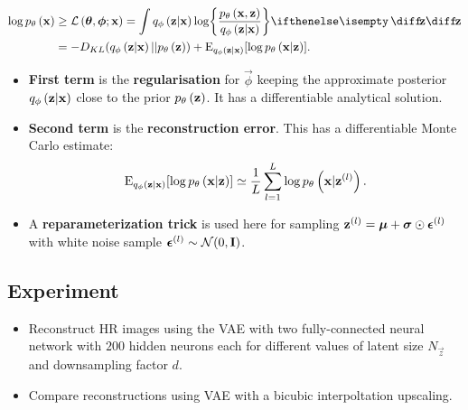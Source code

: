 \begin{itemize}
		\begin{gather*}
			\begin{split}
				\log \dec{\vec{x}} & \ge \mathcal{L}\left(\vec{\theta},\vec{\phi};\vec{x}\right) =
				\int \enc{\vec{z}|\vec{x}} \log \curlies*{ \frac{\dec{\vec{x},\vec{z}}}{\enc{\vec{z}|\vec{x}} } } \D{\vec{z}} \\
				& = -D_{KL}\parens{ \enc{\vec{z}|\vec{x}}||\dec{\vec{z}} } + \E_{\enc{\vec{z}|\vec{x}}} \brackets*{\log \dec{\vec{x}|\vec{z}}} .
			\end{split}
		\end{gather*}
	\begin{itemize}
		\item \textbf{First term} is the \textbf{regularisation} for $\vec{\phi}$ keeping the approximate posterior $q_{\phi}\left(\bm{\mathrm{z}}|\bm{\mathrm{x}}\right)$ close to the prior $p_{\theta}\left(\bm{\mathrm{z}}\right)$. It has a differentiable analytical solution.
		\item \textbf{Second term} is the \textbf{reconstruction error}. This has a differentiable Monte Carlo estimate:
		\begin{equation*}
			\operatorname{E}_{q_{\phi}\left(\bm{\mathrm{z}}|\bm{\mathrm{x}}\right)} [\log p_{\theta}\left(\bm{\mathrm{x}}|\bm{\mathrm{z}}\right) ] \simeq \frac{1}{L}\sum^L_{l=1} \log p_{\theta}\left(\bm{\mathrm{x}}|\bm{\mathrm{z}}^{(l)}\right).
		\end{equation*}
		\item A \textbf{reparameterization trick} is used here for sampling $\bm{\mathrm{z}}^{(l)}= \bm{\mathrm{\mu}} + \bm{\mathrm{\sigma}} \odot \bm{\mathrm{\epsilon}}^{(l)}$ with white noise sample $\bm{\mathrm{\epsilon}}^{(l)} \sim \mathcal{N}(0,\bm{\mathrm{I}})$.
		\end{itemize}
	
\end{itemize}




\subsection{Experiment}
\label{sub:experiments}

\begin{itemize}
	\item Reconstruct HR images using the VAE with two fully-connected neural network with $200$ hidden neurons each for different values of latent size $N_{\vec{z}}$ and downsampling factor $d$.
	\item Compare reconstructions using VAE with a bicubic interpoltation upscaling.
\end{itemize}
